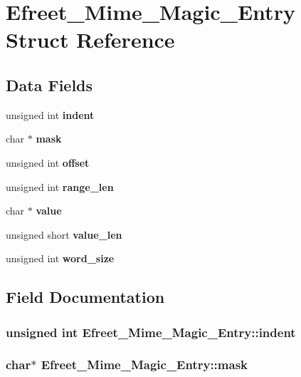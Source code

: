 \section{Efreet\_\-Mime\_\-Magic\_\-Entry Struct Reference}
\label{structEfreet__Mime__Magic__Entry}
\subsection*{Data Fields}
\begin{CompactItemize}
\item 
unsigned int {\bf indent}
\item 
char $\ast$ {\bf mask}
\item 
unsigned int {\bf offset}
\item 
unsigned int {\bf range\_\-len}
\item 
char $\ast$ {\bf value}
\item 
unsigned short {\bf value\_\-len}
\item 
unsigned int {\bf word\_\-size}
\end{CompactItemize}


\subsection{Field Documentation}
\subsubsection{\setlength{\rightskip}{0pt plus 5cm}unsigned int {\bf Efreet\_\-Mime\_\-Magic\_\-Entry::indent}}\label{structEfreet__Mime__Magic__Entry_cdab57a00bb85abfd5b8127d154c0331}


\subsubsection{\setlength{\rightskip}{0pt plus 5cm}char$\ast$ {\bf Efreet\_\-Mime\_\-Magic\_\-Entry::mask}}\label{structEfreet__Mime__Magic__Entry_bf5c05dc06030380579b069bc4f8ccf4}


